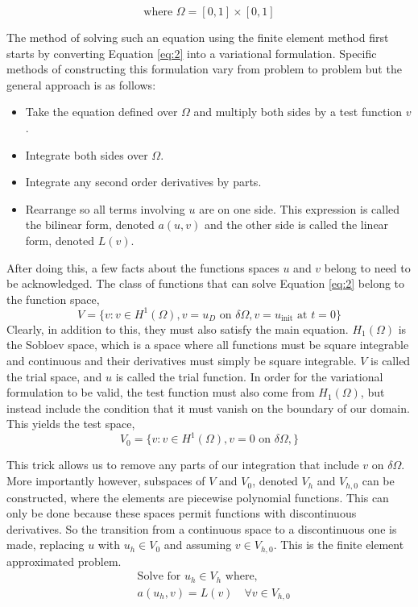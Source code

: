 $$
\text{where } \Omega = [0, 1] \times [0, 1]
$$

The method of solving such an equation using the finite element method first starts by converting Equation \ref{eq:2} into a variational formulation. Specific methods of constructing this formulation vary from problem to problem but the general approach is as follows:

\begin{itemize}
    \item Take the equation defined over $\Omega$ and multiply both sides by a test function $v$.
    \item Integrate both sides over $\Omega$.
    \item Integrate any second order derivatives by parts.
    \item Rearrange so all terms involving $u$ are on one side. This expression is called the bilinear form, denoted $a(u,v)$ and the other side is called the linear form, denoted $L(v)$.
\end{itemize}

After doing this, a few facts about the functions spaces $u$ and $v$ belong to need to be acknowledged. The class of functions that can solve Equation \ref{eq:2} belong to the function space,
$$V=\{ v : v \in H^1(\Omega), v=u_D \text{ on } \delta\Omega, v=u_\text{init} \text{ at } t=0 \}$$
Clearly, in addition to this, they must also satisfy the main equation. $H_1(\Omega)$ is the Sobloev space, which is a space where all functions must be square integrable and continuous and their derivatives must simply be square integrable. $V$ is called the trial space, and $u$ is called the trial function. In order for the variational formulation to be valid, the test function must also come from $H_1(\Omega)$, but instead include the condition that it must vanish on the boundary of our domain. This yields the test space,
$$V_0 = \{ v : v \in H^1(\Omega), v=0 \text{ on } \delta\Omega, \}$$

This trick allows us to remove any parts of our integration that include $v$ on $\delta\Omega$. More importantly however, subspaces of $V$ and $V_0$, denoted $V_h$ and $V_{h,0}$ can be constructed, where the elements are piecewise polynomial functions. This can only be done because these spaces permit functions with discontinuous derivatives. So the transition from a continuous space to a discontinuous one is made, replacing $u$ with $u_h \in V_0$ and assuming $v \in V_{h,0}$. This is the finite element approximated problem.
\begin{align}
&\text{Solve for $u_h \in V_h$ where,} \nonumber \\
&a(u_h,v) = L(v) \quad \forall v \in V_{h,0} \label{eq:3}
\end{align}


